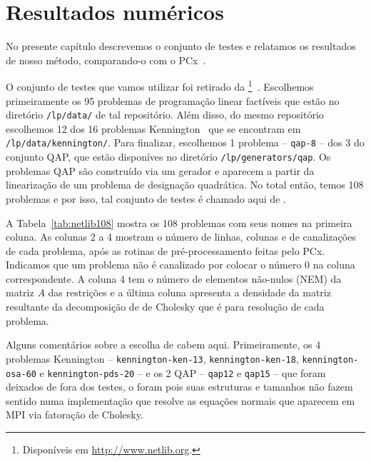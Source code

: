 

\chapter{Resultados numéricos}
\label{chap:numerical}



No presente capítulo descrevemos o conjunto de testes e relatamos os resultados de nosso método, comparando-o com o  PCx~\cite{Czyzyk:1999hk}.




O conjunto de testes que vamos utilizar foi retirado da \Netlib\footnote{Disponíveis em \url{http://www.netlib.org}.}~\cite{Dongarra:1987jk}. Escolhemos primeiramente os \num{95} problemas de programação linear factíveis que estão no diretório \verb|/lp/data/| de tal repositório.  Além disso, do mesmo repositório escolhemos \num{12} dos \num{16} problemas Kennington~\cite{Kennington:1990vo} que se encontram em \verb|/lp/data/kennington/|. Para finalizar, escolhemos 1 problema -- \texttt{qap-8} -- dos \num{3} do conjunto  QAP, que estão disponíves no diretório \verb|/lp/generators/qap|. Os problemas QAP são  construído via um gerador  e  aparecem a partir da linearização de um problema  de designação quadrática. No total então, temos 108 problemas e por isso, tal conjunto de testes é chamado aqui de . 


A Tabela~\ref{tab:netlib108} mostra os \num{108} problemas com seus nomes na primeira coluna. As colunas 2 a 4 mostram o número de linhas, colunas e de canalizações de cada problema, após as rotinas de pré-processamento feitas pelo PCx. Indicamos que um problema  não é canalizado por colocar o número \num{0} na coluna correspondente. A coluna 4 tem o número de elementos não-nulos (NEM) da matriz $A$ das restrições e a última coluna apresenta a densidade da matriz resultante da decomposição de de Cholesky que é para resolução de cada problema.


Alguns comentários sobre a escolha de  cabem aqui. Primeiramente, os \num{4} problemas  Kennington -- \texttt{kennington-ken-13}, \texttt{kennington-ken-18}, \texttt{ken\-ning\-ton-osa-60} e \texttt{ken\-ning\-ton-pds-20} --  e os \num{2} QAP -- \texttt{qap12} e \texttt{qap15} --  que foram deixados de fora dos testes, o foram pois suas estruturas e tamanhos não fazem sentido numa implementação que resolve as equações normais que aparecem em \ac{MPI} via fatoração de Cholesky. 

